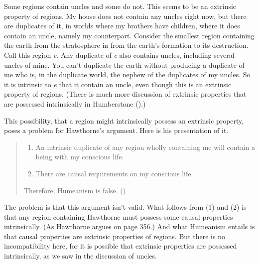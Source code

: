 \documentclass[
  10pt,
  letterpaper,
  DIV=11,
  numbers=noendperiod,
  twoside]{scrartcl}
\providecommand{\tightlist}{%
  \setlength{\itemsep}{0pt}\setlength{\parskip}{0pt}}\usepackage{longtable,booktabs,array}
\begin{document}
Some regions contain uncles and some do not. This seems to be an
extrinsic property of regions. My house does not contain any uncles
right now, but there are duplicates of it, in worlds where my brothers
have children, where it does contain an uncle, namely my counterpart.
Consider the smallest region containing the earth from the stratosphere
in from the earth's formation to its destruction. Call this region
\emph{e}. Any duplicate of \emph{e} also contains uncles, including
several uncles of mine. You can't duplicate the earth without producing
a duplicate of me who is, in the duplicate world, the nephew of the
duplicates of my uncles. So it is intrinsic to \emph{e} that it contain
an uncle, even though this is an extrinsic property of regions. (There
is much more discussion of extrinsic properties that are possessed
intrinsically in Humberstone ().)

This possibility, that a region might intrinsically possess an extrinsic
property, poses a problem for Hawthorne's argument. Here is his
presentation of it.

\begin{quote}
\begin{enumerate}
\def\labelenumi{\arabic{enumi}.}
\tightlist
\item
  An intrinsic duplicate of any region wholly containing me will contain
  a being with my conscious life.
\item
  There are causal requirements on my conscious life.
\end{enumerate}

Therefore, Humeanism is false.
()
\end{quote}

The problem is that this argument isn't valid. What follows from (1) and
(2) is that any region containing Hawthorne must possess some causal
properties intrinsically. (As Hawthorne argues on page 356.) And what
Humeanism entails is that causal properties are extrinsic properties of
regions. But there is no incompatibility here, for it is possible that
extrinsic properties are possessed intrinsically, as we saw in the
discussion of uncles.
\end{document}
